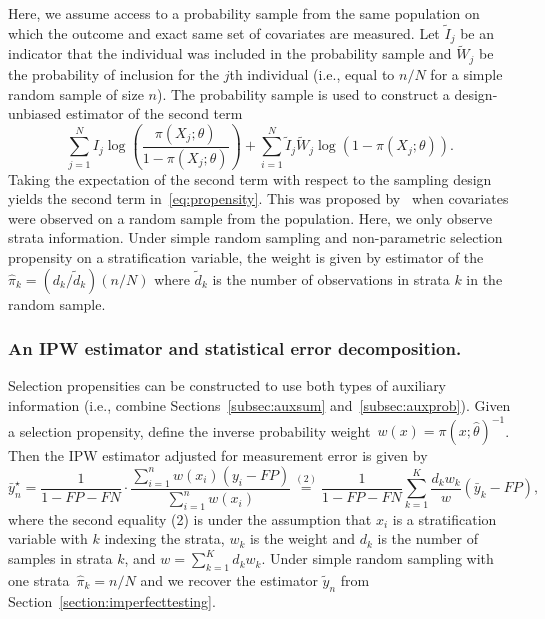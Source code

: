 \documentclass[11pt]{amsart}
\begin{document}
Here, we assume access to a probability sample from the same population on which the outcome and exact same set of covariates are measured.  Let $\tilde I_j$ be an indicator that the individual was included in the probability sample and $\tilde W_j$ be the probability of inclusion for the $j$th individual (i.e., equal to $n/N$ for a simple random sample of size $n$). The probability sample is used to construct a design-unbiased estimator of the second term
\begin{equation}
\label{eq:auxinfoprob}
\sum_{j=1}^N I_j \log \left( \frac{\pi (X_j; \theta)}{1-\pi(X_j; \theta)} \right)  + \sum_{i=1}^N \tilde I_j \tilde W_j \log ( 1 - \pi (X_j; \theta)).
\end{equation}
Taking the expectation of the second term with respect to the sampling design yields the second term in~\eqref{eq:propensity}.  This was proposed by~\cite{Chen2019} when covariates were observed on a random sample from the population. Here, we only observe strata information.  Under simple random sampling and non-parametric selection propensity on a stratification variable, the weight is given by estimator of the $\hat \pi_k = (d_k / \tilde d_k) (n / N)$ where $\tilde d_k$ is the number of observations in strata $k$ in the random sample.

\subsubsection{An IPW estimator and statistical error decomposition.}

Selection propensities can be constructed to use both types of auxiliary information (i.e., combine Sections~\ref{subsec:auxsum} and~\ref{subsec:auxprob}). Given a selection propensity, define the inverse probability weight~$w(x) = \pi (x; \hat \theta)^{-1}$. Then the IPW estimator adjusted for measurement error is given by
$$
\bar y_n^\star
= \frac{1}{1-FP-FN} \cdot \frac{\sum_{i=1}^n w(x_i) (y_i - FP)}{\sum_{i=1}^n w (x_i)}
\stackrel{(2)}{=} \frac{1}{1-FP-FN} \sum_{k=1}^K \frac{d_k w_k}{w} (\bar y_k - FP),
$$
where the second equality (2) is under the assumption that $x_i$ is a stratification variable with $k$ indexing the strata, $w_k$ is the weight and $d_k$ is the number of samples in strata $k$, and $w = \sum_{k=1}^K d_k w_k$. Under simple random sampling with one strata~$\hat \pi_k = n/N$ and we recover the estimator $\tilde y_n$ from Section~\ref{section:imperfecttesting}.
\end{document}
